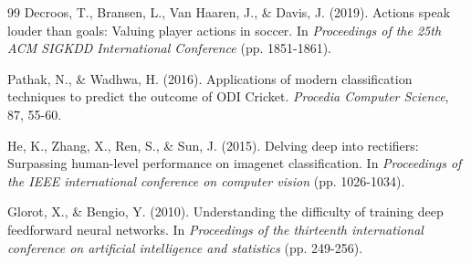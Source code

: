 \documentclass[11pt]{article}
\begin{document}
\begin{thebibliography}{99}
Decroos, T., Bransen, L., Van Haaren, J., \& Davis, J. (2019). Actions speak louder than goals: Valuing player actions in soccer. In \textit{Proceedings of the 25th ACM SIGKDD International Conference} (pp. 1851-1861).

Pathak, N., \& Wadhwa, H. (2016). Applications of modern classification techniques to predict the outcome of ODI Cricket. \textit{Procedia Computer Science}, 87, 55-60.

He, K., Zhang, X., Ren, S., \& Sun, J. (2015). Delving deep into rectifiers: Surpassing human-level performance on imagenet classification. In \textit{Proceedings of the IEEE international conference on computer vision} (pp. 1026-1034).

Glorot, X., \& Bengio, Y. (2010). Understanding the difficulty of training deep feedforward neural networks. In \textit{Proceedings of the thirteenth international conference on artificial intelligence and statistics} (pp. 249-256).

\end{thebibliography}
\end{document}
